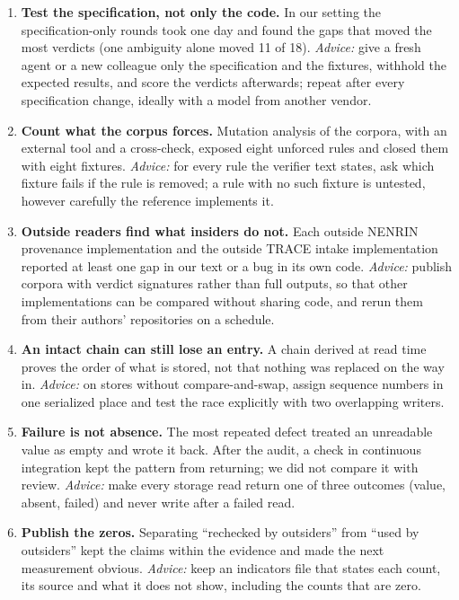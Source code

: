 \documentclass[preprint,12pt,authoryear]{elsarticle}
\begin{document}
\begin{enumerate}[label=L\arabic*.]
\item \textbf{Test the specification, not only the code.} In our setting the specification-only rounds took one day and found the gaps that moved the most verdicts (one ambiguity alone moved 11 of 18). \emph{Advice:} give a fresh agent or a new colleague only the specification and the fixtures, withhold the expected results, and score the verdicts afterwards; repeat after every specification change, ideally with a model from another vendor.
\item \textbf{Count what the corpus forces.} Mutation analysis of the corpora, with an external tool and a cross-check, exposed eight unforced rules and closed them with eight fixtures. \emph{Advice:} for every rule the verifier text states, ask which fixture fails if the rule is removed; a rule with no such fixture is untested, however carefully the reference implements it.
\item \textbf{Outside readers find what insiders do not.} Each outside NENRIN provenance implementation and the outside TRACE intake implementation reported at least one gap in our text or a bug in its own code. \emph{Advice:} publish corpora with verdict signatures rather than full outputs, so that other implementations can be compared without sharing code, and rerun them from their authors' repositories on a schedule.
\item \textbf{An intact chain can still lose an entry.} A chain derived at read time proves the order of what is stored, not that nothing was replaced on the way in. \emph{Advice:} on stores without compare-and-swap, assign sequence numbers in one serialized place and test the race explicitly with two overlapping writers.
\item \textbf{Failure is not absence.} The most repeated defect treated an unreadable value as empty and wrote it back. After the audit, a check in continuous integration kept the pattern from returning; we did not compare it with review. \emph{Advice:} make every storage read return one of three outcomes (value, absent, failed) and never write after a failed read.
\item \textbf{Publish the zeros.} Separating ``rechecked by outsiders'' from ``used by outsiders'' kept the claims within the evidence and made the next measurement obvious. \emph{Advice:} keep an indicators file that states each count, its source and what it does not show, including the counts that are zero.
\end{enumerate}
\end{document}
